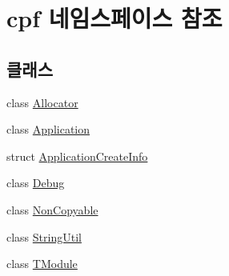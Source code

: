 \hypertarget{namespacecpf}{}\section{cpf 네임스페이스 참조}
\label{namespacecpf}
\subsection*{클래스}
\begin{DoxyCompactItemize}
\item 
class \hyperlink{classcpf_1_1_allocator}{Allocator}
\item 
class \hyperlink{classcpf_1_1_application}{Application}
\item 
struct \hyperlink{structcpf_1_1_application_create_info}{Application\+Create\+Info}
\item 
class \hyperlink{classcpf_1_1_debug}{Debug}
\item 
class \hyperlink{classcpf_1_1_non_copyable}{Non\+Copyable}
\item 
class \hyperlink{classcpf_1_1_string_util}{String\+Util}
\item 
class \hyperlink{classcpf_1_1_t_module}{T\+Module}
\end{DoxyCompactItemize}
